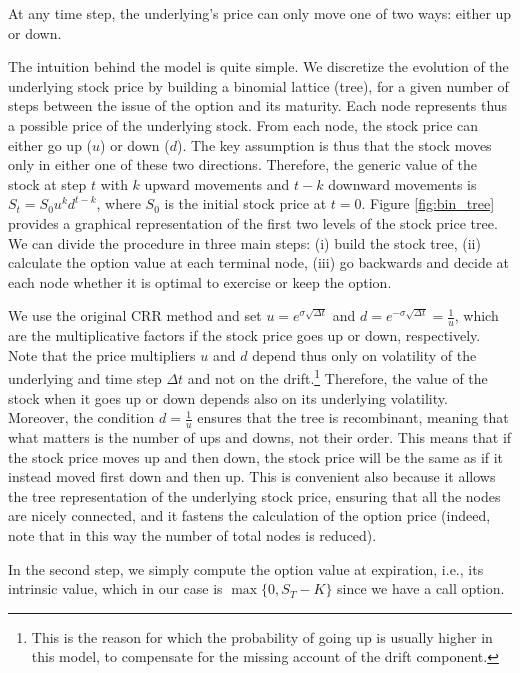 \begin{assumption}
    \label{ass:bin_9}
    At any time step, the underlying's price can only move one of two ways: either up or down.
\end{assumption}

The intuition behind the model is quite simple. We discretize the evolution of the underlying stock price by building a binomial lattice (tree), for a given number of steps between the issue of the option and its maturity. Each node represents thus a possible price of the underlying stock. From each node, the stock price can either go up ($u$) or down ($d$). The key assumption is thus that the stock moves only in either one of these two directions. Therefore, the generic value of the stock at step $t$ with $k$ upward movements and $t-k$ downward movements is $S_t = S_0 u^k d^{t-k}$, where $S_0$ is the initial stock price at $t=0$. Figure \ref*{fig:bin_tree} provides a graphical representation of the first two levels of the stock price tree. 
We can divide the procedure in three main steps: (i) build the stock tree, (ii) calculate the option value at each terminal node, (iii) go backwards and decide at each node whether it is optimal to exercise or keep the option.

We use the original CRR method and set $u = e^{\sigma \sqrt{\Delta t}}$ and $d = e^{-\sigma \sqrt{\Delta t}}=\frac{1}{u}$, which are the multiplicative factors if the stock price goes up or down, respectively. Note that the price multipliers $u$ and $d$ depend thus only on volatility of the underlying and time step $\Delta t$ and not on the drift.\footnote{This is the reason for which the probability of going up is usually higher in this model, to compensate for the missing account of the drift component.} Therefore, the value of the stock when it goes up or down depends also on its underlying volatility. Moreover, the condition $d = \frac{1}{u}$ ensures that the tree is recombinant, meaning that what matters is the number of ups and downs, not their order. This means that if the stock price moves up and then down, the stock price will be the same as if it instead moved first down and then up. This is convenient also because it allows the tree representation of the underlying stock price, ensuring that all the nodes are nicely connected, and it fastens the calculation of the option price (indeed, note that in this way the number of total nodes is reduced). 

In the second step, we simply compute the option value at expiration, i.e., its intrinsic value, which in our case is $\max \{0, S_T - K \}$ since we have a call option.

